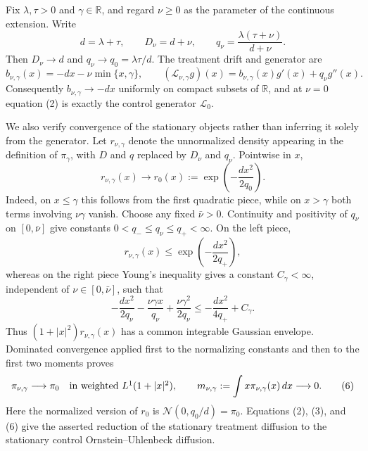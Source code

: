 Fix \(\lambda,\tau>0\) and \(\gamma\in\mathbb R\), and regard \(\nu\geq0\) as the parameter of the continuous extension.  Write
\[
 d=\lambda+\tau,\qquad D_\nu=d+\nu,
 \qquad q_\nu=\frac{\lambda(\tau+\nu)}{d+\nu}.
 \tag{1}
\]
Then \(D_\nu\to d\) and \(q_\nu\to q_0=\lambda\tau/d\).  The treatment drift and generator are
\[
 b_{\nu,\gamma}(x)=-dx-\nu\min\{x,\gamma\},
 \qquad
 (\mathcal L_{\nu,\gamma}g)(x)
 =b_{\nu,\gamma}(x)g'(x)+q_\nu g''(x).
 \tag{2}
\]
Consequently \(b_{\nu,\gamma}\to-dx\) uniformly on compact subsets of \(\mathbb R\), and at \(\nu=0\) equation (2) is exactly the control generator \(\mathcal L_0\).

We also verify convergence of the stationary objects rather than inferring it solely from the generator.  Let \(r_{\nu,\gamma}\) denote the unnormalized density appearing in the definition of \(\pi_\gamma\), with \(D\) and \(q\) replaced by \(D_\nu\) and \(q_\nu\).  Pointwise in \(x\),
\[
 r_{\nu,\gamma}(x)\longrightarrow
 r_0(x):=\exp\!\left(-\frac{d x^2}{2q_0}\right).
 \tag{3}
\]
Indeed, on \(x\leq\gamma\) this follows from the first quadratic piece, while on \(x>\gamma\) both terms involving \(\nu\gamma\) vanish.  Choose any fixed \(\bar\nu>0\).  Continuity and positivity of \(q_\nu\) on \([0,\bar\nu]\) give constants \(0<q_-\leq q_\nu\leq q_+<\infty\).  On the left piece,
\[
 r_{\nu,\gamma}(x)
 \leq \exp\!\left(-\frac{d x^2}{2q_+}\right),
 \tag{4}
\]
whereas on the right piece Young's inequality gives a constant \(C_\gamma<\infty\), independent of \(\nu\in[0,\bar\nu]\), such that
\[
 -\frac{d x^2}{2q_\nu}-\frac{\nu\gamma x}{q_\nu}
 +\frac{\nu\gamma^2}{2q_\nu}
 \leq -\frac{d x^2}{4q_+}+C_\gamma.
 \tag{5}
\]
Thus \((1+|x|^2)r_{\nu,\gamma}(x)\) has a common integrable Gaussian envelope.  Dominated convergence applied first to the normalizing constants and then to the first two moments proves
\[
 \pi_{\nu,\gamma}\longrightarrow\pi_0
 \quad\hbox{in weighted \(L^1(1+|x|^2)\)},
 \qquad
 m_{\nu,\gamma}:=\int x\pi_{\nu,\gamma}(x)\,dx\longrightarrow0.
 \tag{6}
\]
Here the normalized version of \(r_0\) is \(\mathcal N(0,q_0/d)=\pi_0\).  Equations (2), (3), and (6) give the asserted reduction of the stationary treatment diffusion to the stationary control Ornstein--Uhlenbeck diffusion.

